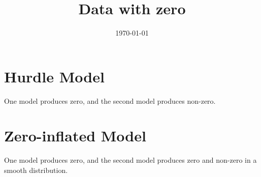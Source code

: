 \documentclass[12pt]{article}
\title{Data with zero}
\date{\today}
\begin{document}
\maketitle

\section{Hurdle Model}
One model produces zero, and the second model produces non-zero.


\section{Zero-inflated Model}
One model produces zero, and the second model produces zero and non-zero in a smooth distribution.
\end{document}
